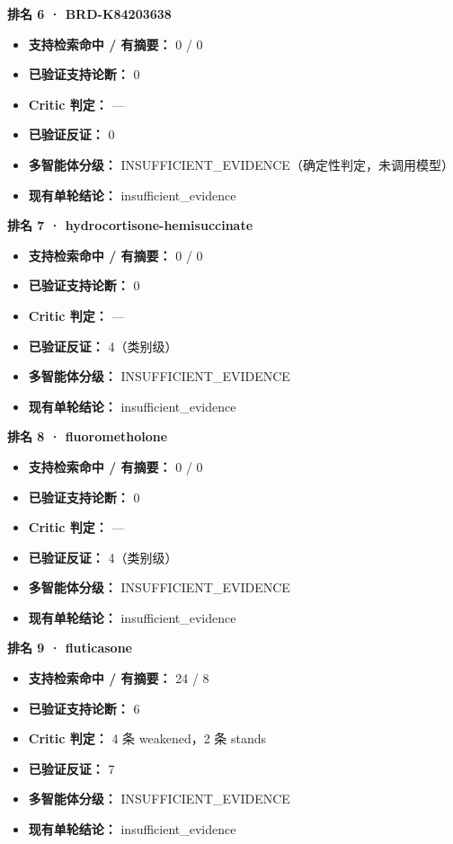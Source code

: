\documentclass[
  10pt,
]{ctexart}
\providecommand{\tightlist}{%
  \setlength{\itemsep}{0pt}\setlength{\parskip}{0pt}}
\begin{document}
\textbf{排名 6 · BRD-K84203638}

\begin{itemize}
\tightlist
\item
  \textbf{支持检索命中 / 有摘要：} 0 / 0
\item
  \textbf{已验证支持论断：} 0
\item
  \textbf{Critic 判定：} ---
\item
  \textbf{已验证反证：} 0
\item
  \textbf{多智能体分级：}
  INSUFFICIENT\_EVIDENCE（确定性判定，未调用模型）
\item
  \textbf{现有单轮结论：} insufficient\_evidence
\end{itemize}

\textbf{排名 7 · hydrocortisone-hemisuccinate}

\begin{itemize}
\tightlist
\item
  \textbf{支持检索命中 / 有摘要：} 0 / 0
\item
  \textbf{已验证支持论断：} 0
\item
  \textbf{Critic 判定：} ---
\item
  \textbf{已验证反证：} 4（类别级）
\item
  \textbf{多智能体分级：} INSUFFICIENT\_EVIDENCE
\item
  \textbf{现有单轮结论：} insufficient\_evidence
\end{itemize}

\textbf{排名 8 · fluorometholone}

\begin{itemize}
\tightlist
\item
  \textbf{支持检索命中 / 有摘要：} 0 / 0
\item
  \textbf{已验证支持论断：} 0
\item
  \textbf{Critic 判定：} ---
\item
  \textbf{已验证反证：} 4（类别级）
\item
  \textbf{多智能体分级：} INSUFFICIENT\_EVIDENCE
\item
  \textbf{现有单轮结论：} insufficient\_evidence
\end{itemize}

\textbf{排名 9 · fluticasone}

\begin{itemize}
\tightlist
\item
  \textbf{支持检索命中 / 有摘要：} 24 / 8
\item
  \textbf{已验证支持论断：} 6
\item
  \textbf{Critic 判定：} 4 条 weakened，2 条 stands
\item
  \textbf{已验证反证：} 7
\item
  \textbf{多智能体分级：} INSUFFICIENT\_EVIDENCE
\item
  \textbf{现有单轮结论：} insufficient\_evidence
\end{itemize}
\end{document}
